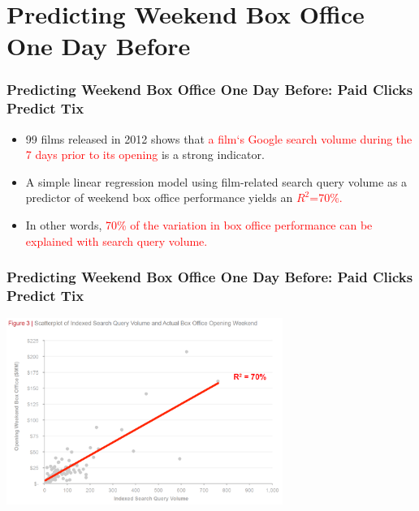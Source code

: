 \documentclass[slidestop,compress,red,mathserif]{beamer}
\begin{document}
\section{Predicting Weekend Box Office One Day Before}
\begin{frame}
\frametitle{Predicting Weekend Box Office One Day Before: Paid Clicks Predict Tix}
\begin{itemize}
	\pause \item 99 films released in 2012 shows that \textcolor{red}{a film`s Google search volume during the 7 days prior to its opening} is a strong indicator. 
	\pause \item A simple linear regression model using film-related search query volume as a predictor of weekend box office performance yields an \textcolor{red}{$R^2$=70\%.}
	\pause \item In other words,  \textcolor{red}{70\% of the variation in box office performance can be explained with search query volume.}
\end{itemize}
\end{frame}
\begin{frame}
\frametitle{Predicting Weekend Box Office One Day Before: Paid Clicks Predict Tix}
\begin{center}
\includegraphics[width=9cm]{fig3.png}
\end{center}
\end{frame}
\end{document}
